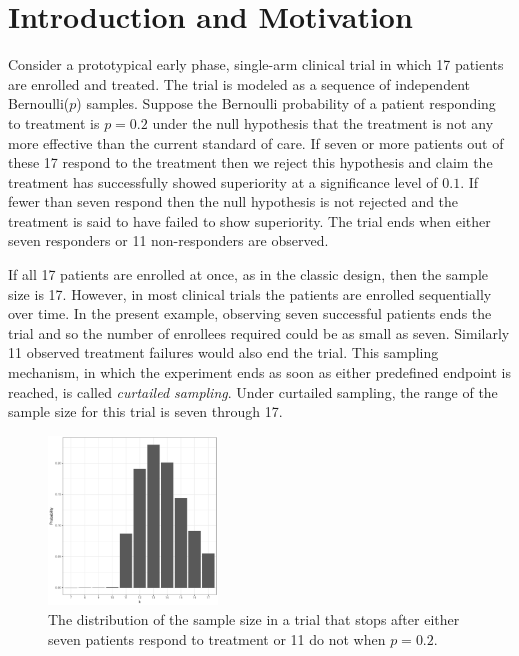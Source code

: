 \documentclass[sii]{ipart}
\begin{document}
\begin{frontmatter}
\begin{keyword}[class=AMS]
\end{keyword}

\begin{keyword}
\end{keyword}

 
\end{frontmatter}

\section{Introduction and Motivation}

Consider a prototypical early phase, single-arm clinical trial in which 17 patients
are enrolled and treated. The trial is modeled as a sequence of independent Bernoulli($p$) samples. Suppose the Bernoulli probability of a patient 
responding to treatment is $p=0.2$ under the null hypothesis that the treatment is not any more effective than the current standard of care.
If seven or more patients out of these 17 respond to the treatment then we 
reject this hypothesis and claim the treatment has successfully showed superiority at 
a significance level of $0.1$.  If fewer than seven respond then the null 
hypothesis is not rejected and the treatment is said to have failed to show superiority. The trial ends when 
either seven responders or 11 non-responders are observed.

If all 17 patients are enrolled at once, as in the classic
design, then the sample size is 17. However, in most clinical trials the
patients are enrolled sequentially over time.
In the present example, observing seven
successful patients ends the trial and so the number of enrollees required
could be as small as seven. Similarly 11
observed treatment failures would also end the trial. This sampling mechanism, in
which the experiment ends as soon as either predefined endpoint is reached, is
called {\em curtailed sampling}. Under curtailed sampling, the range of the
sample size for this trial is seven through 17.

\begin{figure}
\centering
\includegraphics[width=0.4\textwidth]{snb-first-plot.pdf}
\caption{
The distribution of the sample size in a trial that stops after either seven patients
respond to treatment or 11 do not when $p=0.2$.
}
\label{fig:kane_viz_1}
\end{figure}
\end{document}
